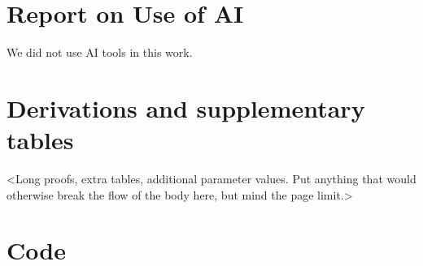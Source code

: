 \documentclass[12pt]{article}
\begin{document}
\section*{Report on Use of AI}

We did not use AI tools in this work.


\appendix
\section{Derivations and supplementary tables}
\label{app:derivations}
<Long proofs, extra tables, additional parameter values. Put anything that
would otherwise break the flow of the body here, but mind the page limit.>

\section{Code}
\label{app:code}
%   
\end{document}

